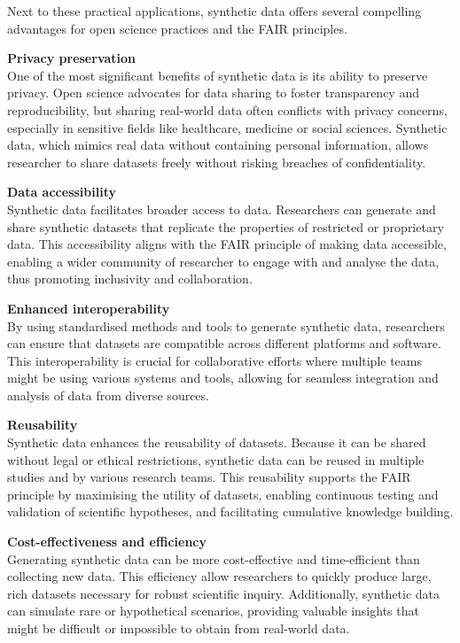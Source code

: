 Next to these practical applications, synthetic data offers several compelling advantages for open science practices and the FAIR principles. 

\textbf{Privacy preservation}\\ 
One of the most significant benefits of synthetic data is its ability to preserve privacy. Open science advocates for data sharing to foster transparency and reproducibility, but sharing real-world data often conflicts with privacy concerns, especially in sensitive fields like healthcare, medicine or social sciences. Synthetic data, which mimics real data without containing personal information, allows researcher to share datasets freely without risking breaches of confidentiality.

\textbf{Data accessibility}\\ 
Synthetic data facilitates broader access to data. Researchers can generate and share synthetic datasets that replicate the properties of restricted or proprietary data. This accessibility aligns with the FAIR principle of making data accessible, enabling a wider community of researcher to engage with and analyse the data, thus promoting inclusivity and collaboration. 

\textbf{Enhanced interoperability}\\
By using standardised methods and tools to generate synthetic data, researchers can ensure that datasets are compatible across different platforms and software. This interoperability is crucial for collaborative efforts where multiple teams might be using various systems and tools, allowing for seamless integration and analysis of data from diverse sources. 

\textbf{Reusability}\\
Synthetic data enhances the reusability of datasets. Because it can be shared without legal or ethical restrictions, synthetic data can be reused in multiple studies and by various research teams. This reusability supports the FAIR principle by maximising the utility of datasets, enabling continuous testing and validation of scientific hypotheses, and facilitating cumulative knowledge building. 

\textbf{Cost-effectiveness and efficiency}\\
Generating synthetic data can be more cost-effective and time-efficient than collecting new data. This efficiency allow researchers to quickly produce large, rich datasets necessary for robust scientific inquiry. Additionally, synthetic data can simulate rare or hypothetical scenarios, providing valuable insights that might be difficult or impossible to obtain from real-world data. \\

